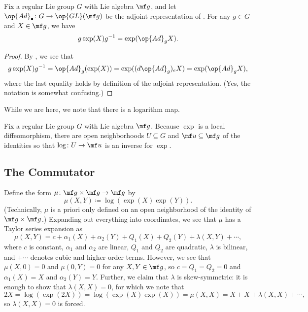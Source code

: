 \documentclass[../notes.tex]{subfiles}
\begin{document}
\begin{proposition}
	Fix a regular Lie group $G$ with Lie algebra $\mf g$, and let $\op{Ad}_\bullet\colon G\to\op{GL}(\mf g)$ be the adjoint representation of . For any $g\in G$ and $X\in\mf g$, we have
	\[g\exp(X)g^{-1}=\exp(\op{Ad}_gX).\]
\end{proposition}
\begin{proof}
	By , we see that
	\[g\exp(X)g^{-1}=\op{Ad}_g(\exp(X))=\exp((d{\op{Ad}_g})_eX)=\exp(\op{Ad}_gX),\]
	where the last equality holds by definition of the adjoint representation. (Yes, the notation is somewhat confusing.)
\end{proof}
While we are here, we note that there is a logarithm map.
\begin{definition}[logarithm]
	Fix a regular Lie group $G$ with Lie algebra $\mf g$. Because $\exp$ is a local diffeomorphism, there are open neighborhoods $U\subseteq G$ and $\mf u\subseteq\mf g$ of the identities so that $\log\colon U\to\mf u$ is an inverse for $\exp$.
\end{definition}

\subsection{The Commutator}
Define the form $\mu\colon\mf g\times\mf g\to\mf g$ by
\[\mu(X,Y)\coloneqq\log(\exp(X)\exp(Y)).\]
(Technically, $\mu$ is a priori only defined on an open neighborhood of the identity of $\mf g\times\mf g$.) Expanding out everything into coordinates, we see that $\mu$ has a Taylor series expansion as
\[\mu(X,Y)=c+\alpha_1(X)+\alpha_2(Y)+Q_1(X)+Q_2(Y)+\lambda(X,Y)+\cdots,\]
where $c$ is constant, $\alpha_1$ and $\alpha_2$ are linear, $Q_1$ and $Q_2$ are quadratic, $\lambda$ is bilinear, and $+\cdots$ denotes cubic and higher-order terms. However, we see that $\mu(X,0)=0$ and $\mu(0,Y)=0$ for any $X,Y\in\mf g$, so $c=Q_1=Q_2=0$ and $\alpha_1(X)=X$ and $\alpha_2(Y)=Y$. Further, we claim that $\lambda$ is skew-symmetric: it is enough to show that $\lambda(X,X)=0$, for which we note that
\[2X=\log(\exp(2X))=\log(\exp(X)\exp(X))=\mu(X,X)=X+X+\lambda(X,X)+\cdots,\]
so $\lambda(X,X)=0$ is forced.
\end{document}
